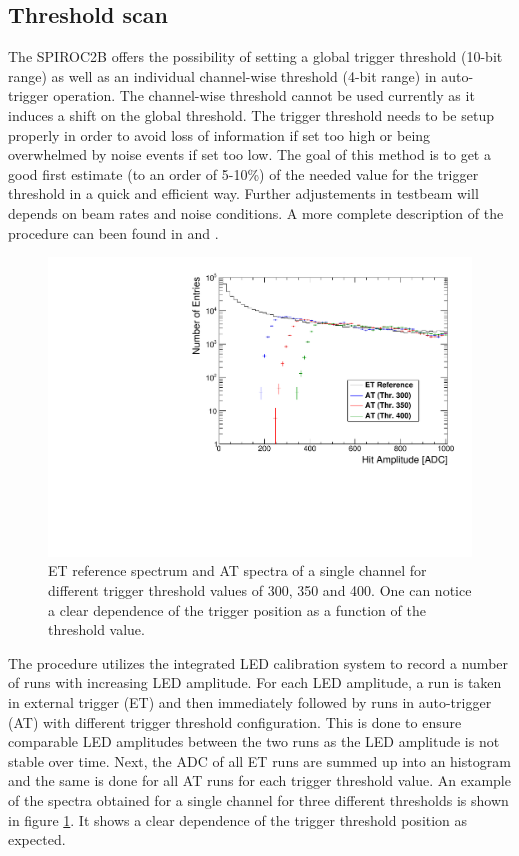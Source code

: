 \subsection{Threshold scan}

The SPIROC2B offers the possibility of setting a global trigger threshold (10-bit range) as well as an individual channel-wise threshold (4-bit range) in auto-trigger operation. The channel-wise threshold cannot be used currently as it induces a shift on the global threshold. The trigger threshold needs to be setup properly in order to avoid loss of information if set too high or being overwhelmed by noise events if set too low. The goal of this method is to get a good first estimate (to an order of 5-10\%) of the needed value for the trigger threshold in a quick and efficient way. Further adjustements in testbeam will depends on beam rates and noise conditions. A more complete description of the procedure can been found in \cite{Hartbrich:2016bbz} and \cite{LloydTrigger}.

\begin{figure}[htbp!]
  \centering
  \includegraphics[width=0.6\linewidth]{../Thesis_Plots/Commissioning/Plots/SpectraADC_HBU2_12.pdf}
  \caption{ET reference spectrum and AT spectra of a single channel for different trigger threshold values of 300, 350 and 400. One can notice a clear dependence of the trigger position as a function of the threshold value.} \label{fig:ADCTriggerThreshold}
\end{figure}

The procedure utilizes the integrated LED calibration system to record a number of runs with increasing LED amplitude. For each LED amplitude, a run is taken in external trigger (ET) and then immediately followed by runs in auto-trigger (AT) with different trigger threshold configuration. This is done to ensure comparable LED amplitudes between the two runs as the LED amplitude is not stable over time. Next, the ADC of all ET runs are summed up into an histogram and the same is done for all AT runs for each trigger threshold value. An example of the spectra obtained for a single channel for three different thresholds is shown in figure \ref{fig:ADCTriggerThreshold}. It shows a clear dependence of the trigger threshold position as expected.

